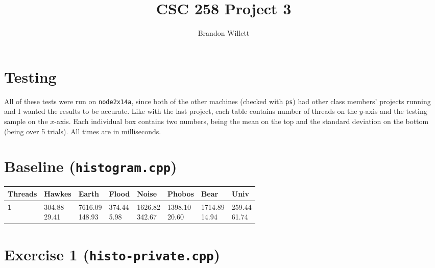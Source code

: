 \documentclass[letterpaper]{article}
\title{CSC 258 Project 3}
\author{Brandon Willett}
\begin{document}
	\maketitle

	\section*{Testing}

	All of these tests were run on \texttt{node2x14a}, since both of the other machines (checked with \texttt{ps}) had other class members' projects running and I wanted the results to be accurate. Like with the last project, each table contains number of threads on the $y$-axis and the testing sample on the $x$-axis. Each individual box contains two numbers, being the mean on the top and the standard deviation on the bottom (being over 5 trials). All times are in milliseconds.

	\section*{Baseline (\texttt{histogram.cpp})}

	\begin{center}
	\begin{tabular}{ |m{5em}|m{5em}|m{5em}|m{5em}|m{5em}|m{5em}|m{5em}|m{5em}| }
	\hline
	\textbf{Threads} & \textbf{Hawkes} & \textbf{Earth} & \textbf{Flood} & \textbf{Noise} & \textbf{Phobos} & \textbf{Bear} & \textbf{Univ} \\ \hline
	\textbf{1}& \makecell{304.88 \\[-0.5em] 29.41}& \makecell{7616.09 \\[-0.5em] 148.93}& \makecell{374.44 \\[-0.5em] 5.98}& \makecell{1626.82 \\[-0.5em] 342.67}& \makecell{1398.10 \\[-0.5em] 20.60}& \makecell{1714.89 \\[-0.5em] 14.94}& \makecell{259.44 \\[-0.5em] 61.74}\\ \hline
	\end{tabular} \end{center} 

	\section*{Exercise 1 (\texttt{histo-private.cpp})}
\end{document}
